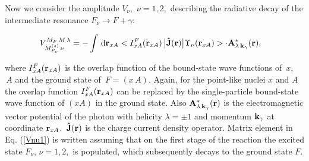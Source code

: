 \documentclass[prl,unsortedaddress,groupedaddress,twocolumn,amsmath,amsfonts,amssymb,showpacs,floatfix,nofootinbib]{revtex4}
\begin{document}
Now we consider the amplitude  $V_{\nu},\,\,\nu=1,2,$ describing the radiative decay of the intermediate resonance $F_{\nu} \to F + \gamma$:
\begin{widetext}
\begin{align}
&V_{M_{F_{\nu}}^{(s)}\,\nu}^{M_{F}\,M\,\lambda}= -\int\,{\rm d}{\rm {\bf r}}_{xA}
<I_{xA}^{F}({\rm {\bf r}}_{xA})\,\big|{\rm {\bf {\hat J}}}({\rm {\bf r}}) \big|\Upsilon_{\nu}({\rm {\bf r}}_{xA})>\cdot {\rm {\bf A}}^{*}_{\lambda\,{\rm {\bf k}}_{\gamma}}({\rm {\bf r}}),
\label{Vnu1}
\end{align}
\end{widetext}
where  $I_{xA}^{F}({\rm {\bf r}}_{xA})$ is the overlap function of the bound-state wave functions of $\,x,$ $\,A$ and the ground state of $\,F=(x\,A)$. Again, for the point-like nuclei $x$ and $A$  the overlap function $I_{xA}^{F}({\rm {\bf r}}_{xA})$  can be replaced by the single-particle  bound-state wave function of $(xA)$ in the ground state. Also ${\rm {\bf A}}^{*}_{\lambda\,{\rm {\bf k}}_{\gamma}}({\rm {\bf r}}) $ is the electromagnetic  vector potential of the photon with helicity $\lambda=\pm 1$ and momentum ${\rm {\bf k}}_{\gamma}$ at coordinate ${\rm {\bf r}}_{xA}$.
$\,{\rm {\bf {\hat J}}}({\rm {\bf r}})$  is the charge current density operator. Matrix element in Eq. (\ref{Vnu1}) is written assuming that on the first stage of the reaction the excited state $F_{\nu},\,\nu=1,2,$ is populated, which subsequently decays to the ground state $F$.
\end{document}

